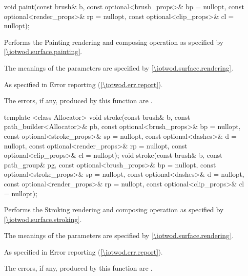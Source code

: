 %
%
\begin{itemdecl}
void paint(const brush& b, const optional<brush_props>& bp = nullopt,
  const optional<render_props>& rp = nullopt,
  const optional<clip_props>& cl = nullopt);
\end{itemdecl}
\begin{itemdescr}
\pnum
\effects
Performs the Painting rendering and composing operation as specified by \ref{\iotwod.surface.painting}.

\pnum
The meanings of the parameters are specified by \ref{\iotwod.surface.rendering}.

\pnum
\throws
As specified in Error reporting (\ref{\iotwod.err.report}).

\pnum
\errors
The errors, if any, produced by this function are .
\end{itemdescr}

%
%
\begin{itemdecl}
template <class Allocator>
void stroke(const brush& b, const path_builder<Allocator>& pb,
  const optional<brush_props>& bp = nullopt,
  const optional<stroke_props>& sp = nullopt,
  const optional<dashes>& d = nullopt,
  const optional<render_props>& rp = nullopt,
  const optional<clip_props>& cl = nullopt);
void stroke(const brush& b, const path_group& pg,
  const optional<brush_props>& bp = nullopt,
  const optional<stroke_props>& sp = nullopt,
  const optional<dashes>& d = nullopt,
  const optional<render_props>& rp = nullopt,
  const optional<clip_props>& cl = nullopt);
\end{itemdecl}
\begin{itemdescr}
\pnum
\effects
Performs the Stroking rendering and composing operation as specified by \ref{\iotwod.surface.stroking}.

\pnum
The meanings of the parameters are specified by \ref{\iotwod.surface.rendering}.

\pnum
\throws
As specified in Error reporting (\ref{\iotwod.err.report}).

\pnum
\errors
The errors, if any, produced by this function are .
\end{itemdescr}

